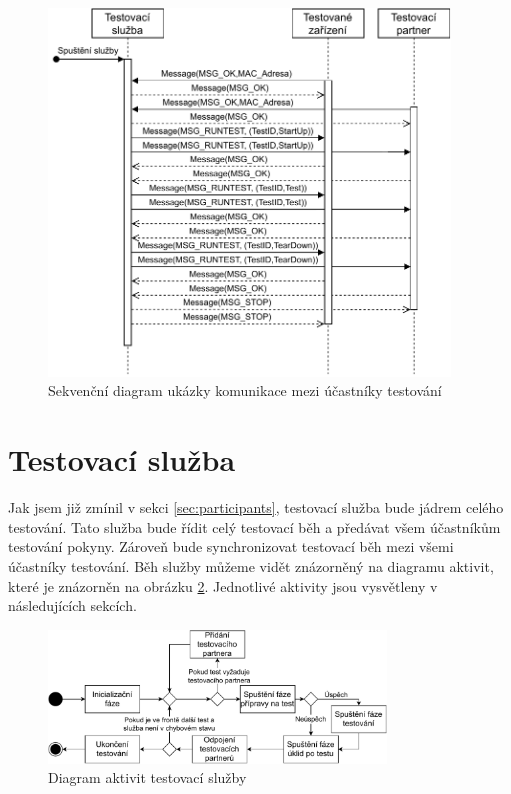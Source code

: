 \begin{figure}[htbp]
    \centering 
    \includegraphics[width=0.95\textwidth]{assets/img/sequencediagram.pdf}
    \caption{Sekvenční diagram ukázky komunikace mezi účastníky testování}
    \label{fig:seqdiag}
\end{figure}

\section{Testovací služba}
Jak jsem již zmínil v sekci \ref{sec:participants}, testovací služba bude jádrem celého testování. Tato služba bude řídit celý testovací běh a předávat všem účastníkům testování pokyny. Zároveň bude synchronizovat testovací běh mezi všemi účastníky testování. Běh služby můžeme vidět znázorněný na diagramu aktivit, které je znázorněn na obrázku \ref{fig:activitydiagramservice}. Jednotlivé aktivity jsou vysvětleny v následujících sekcích. 

\begin{figure}[htbp]
    \centering 
    \includegraphics[width=0.8\textwidth]{assets/img/activitydiagramservice.pdf}
    \caption{Diagram aktivit testovací služby}
    \label{fig:activitydiagramservice}
\end{figure}

